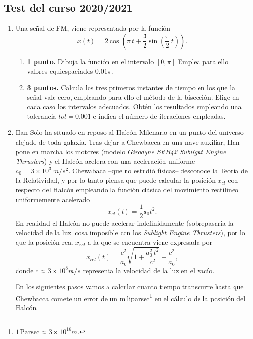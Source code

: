 \begin{paracol}{2}
\section{Test del curso 2020/2021}
\begin{enumerate}
\item Una señal de FM, viene representada por la función
\begin{equation}
	x(t) = 2\cos\left(\pi \, t+ \frac{3}{2}\sin\left(\frac{\pi}{2} \, t\right)\right).
\end{equation}
\begin{enumerate}
	\item \textbf{1 punto. }Dibuja la función en el intervalo $[0,\pi]$ Emplea para ello valores equiespaciados $0.01\pi$.
	\item \textbf{3 puntos. }Calcula los tres primeros instantes de tiempo en los que la señal vale cero, empleando para ello el método de la bisección. Elige en cada caso los intervalos adecuados. Obtén los resultados empleando una tolerancia $tol=0.001$ e indica el número de iteraciones empleadas.
\end{enumerate}

\item  Han Solo ha situado en reposo al Halcón Milenario en un punto del universo alejado de toda galaxia. Tras dejar a Chewbacca en una nave auxiliar, Han pone en marcha los motores (modelo \emph{Girodyne SRB42 Sublight Engine Thrusters}) y el Halcón acelera con una aceleración uniforme $a_0 = 3\times10^3\ m/s^2$. Chewabaca --que no estudió físicas--  desconoce la Teoría de la Relatividad, y por lo tanto piensa que puede calcular la posición $x_{cl}$ con respecto del Halcón empleando la función clásica del movimiento rectilíneo uniformemente acelerado
\begin{equation}
	x_{cl}(t) =\frac{1}{2}a_0t^2.
\end{equation}
		En realidad el Halcón no puede acelerar indefinidamente (sobrepasaría la velocidad de la luz, cosa imposible con los \emph{Sublight Engine Thrusters}), por lo que la posición real $x_{rel}$ a la que se encuentra viene expresada por
\begin{equation}
	x_{rel}(t) = \frac{c^2}{a_0}\sqrt{1 + \frac{a_0^2\,t^2}{c^2}} -\frac{c^2}{a_0}, 
\end{equation}
		donde $c \approx 3\times 10^8 m/s$ representa la velocidad de la luz en el vacío. 

		En los siguientes pasos vamos a calcular cuanto tiempo transcurre hasta que Chewbacca comete un error de un miliparsec\footnote{$1\,\text{Parsec} \approx 3\times 10^{16}m$.} en el cálculo de la posición del Halcón.


\end{enumerate}
\end{paracol}
